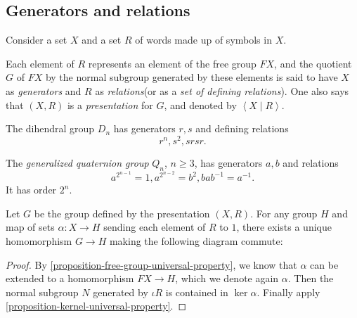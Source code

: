 \subsection{Generators and relations}
\label{subsection-generators-and-relations}

Consider a set \( X \) and a set \( R \) of words made up of symbols in \( X \).
\begin{definition}
  \label{definition-generator}
  \label{definition-relation}
  \label{definition-presentation}
  Each element of \( R \) represents an element of the free group \( FX \), and the quotient \( G \) of \( FX \) by the normal subgroup generated by these elements is said to have \( X \) as \emph{generators} and \( R \) as \emph{relations}(or as a \emph{set of defining relations}).
  One also says that \( (X, R) \) is a \emph{presentation} for \( G \), and denoted by \( \left\langle X \mid R \right\rangle \).
\end{definition}

\begin{example}
  \label{example-dihendral-group-presentation}
  The dihendral group \( D_n \) has generators \( r, s \) and defining relations
  \[
    r^n, s^2, srsr.
  \]
\end{example}

\begin{example}
  \label{example-generalized-quaternion-group-presentation}
  The \emph{generalized quaternion group} \( Q_n \), \( n \geq 3 \), has generators \( a, b \) and relations
  \[
    a^{2^{n - 1}} = 1, a^{2^{n - 2}} = b^2, bab^{-1} = a^{-1}.
  \]
  It has order \( 2^n \).
\end{example}

\begin{proposition}
  \label{proposition-presentation-universal-property}
  Let \( G \) be the group defined by the presentation \( (X, R) \).
  For any group \( H \) and map of sets \( \alpha: X \to H \) sending each element of \( R \) to \( 1 \), there exists a unique homomorphism \( G \to H \) making the following diagram commute:
  \begin{center}
  \end{center}
\end{proposition}
\begin{proof}
  By \ref{proposition-free-group-universal-property}, we know that \( \alpha \) can be extended to a homomorphism \( FX \to H \), which we denote again \( \alpha \).
  Then the normal subgroup \( N \) generated by \( \iota R \) is contained in \( \ker \alpha \).
  Finally apply \ref{proposition-kernel-universal-property}.
\end{proof}

